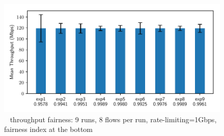 \begin{figure}[!t]
\centering
\includegraphics[width=\columnwidth]{../raw_data/spring_fairness/figure.pdf}
\caption{~\spring{} throughput fairness: 9 runs, 8 flows per run, rate-limiting=1Gbps, fairness index at the bottom}
\label{fig:spring:fairness}
\end{figure}
